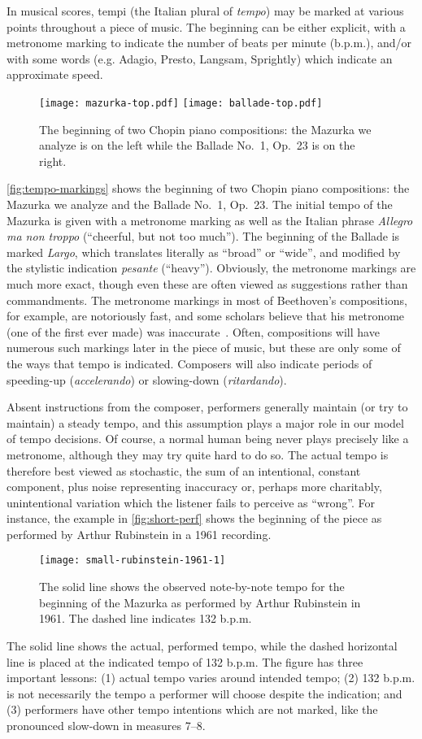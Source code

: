 \documentclass[12pt]{article}
\begin{document}
In musical scores, tempi (the Italian plural of {\em tempo}) may be
marked at various points throughout a piece of music. The
beginning can be either explicit, with a metronome marking to
indicate the number of beats per minute (b.p.m.), and/or with some words
(e.g. Adagio, Presto, Langsam, Sprightly) which indicate an
approximate speed. 
\begin{figure}[t!]
  \centering
  \texttt{[image: mazurka-top.pdf]}
  \texttt{[image: ballade-top.pdf]}
  \caption{The beginning of two Chopin piano compositions: the Mazurka
    we analyze is on the left while the Ballade No.\ 1, Op.\ 23 is on
    the right.}
  \label{fig:tempo-markings}
\end{figure}
\autoref{fig:tempo-markings} shows the beginning of two Chopin piano
compositions: the Mazurka we analyze and the Ballade No.\ 1, Op.\ 23. The initial tempo of the Mazurka is given with a metronome
marking as well as the Italian phrase {\em Allegro ma non troppo}
(``cheerful, but not too much''). The beginning of the Ballade is 
marked {\em Largo}, which translates literally as ``broad'' or
``wide'', and modified by the stylistic indication {\em pesante}
(``heavy''). Obviously, the metronome markings are much more exact,
though even these are often viewed as suggestions rather than
commandments. The metronome markings in most of Beethoven's
compositions, for example, are notoriously fast, and some scholars
believe that his metronome (one of the first ever made) was
inaccurate~\citep{ForsenGray2013}. Often, compositions will have numerous such markings later
in the piece of music, but these are only some of the ways that tempo
is indicated. Composers will also indicate periods of speeding-up
(\emph{accelerando}) or
slowing-down (\emph{ritardando}).

Absent instructions from the composer, performers generally maintain
(or try to maintain) a steady tempo, and this assumption plays a major
role in our model of tempo decisions. Of course, a normal human being
never plays precisely like a 
metronome, although they may try quite hard to do so. The actual
tempo is therefore best viewed as stochastic, the sum of an
intentional, constant component, plus noise representing inaccuracy
or, perhaps more charitably, unintentional variation which the
listener fails to perceive as ``wrong''. For instance, the example in
\autoref{fig:short-perf} shows the beginning of the piece as performed
by Arthur Rubinstein in a 1961 recording. 
\begin{figure}[t!]
 \centering
 \texttt{[image: small-rubinstein-1961-1]}
 \caption{The solid line shows the observed note-by-note tempo for
   the beginning of the Mazurka as performed by Arthur Rubinstein in
   1961. The dashed line indicates 132 b.p.m.}
 \label{fig:short-perf}
\end{figure}
The solid line shows the
actual, performed tempo, while the dashed horizontal line is placed at
the indicated tempo of 132 b.p.m. The figure has three important
lessons: (1) actual tempo varies around intended tempo; (2) 132 b.p.m. is
not necessarily the tempo a performer will choose despite the
indication; and (3) performers have other tempo intentions which are
not marked, like the pronounced slow-down in measures 7--8.
\end{document}
